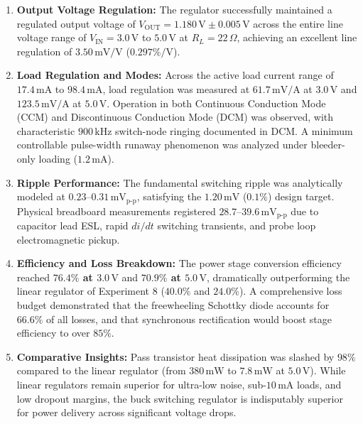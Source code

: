 \documentclass[12pt,a4paper]{article}
\newcommand{\Vout}{V_{\mathrm{OUT}}}
\newcommand{\Vin}{V_{\mathrm{IN}}}
\begin{document}
\begin{enumerate}[leftmargin=1.5em]
    \item \textbf{Output Voltage Regulation:} The regulator successfully maintained a regulated output voltage of $\Vout = 1.180\,\mathrm{V} \pm 0.005\,\mathrm{V}$ across the entire line voltage range of $\Vin = 3.0\,\mathrm{V}$ to $5.0\,\mathrm{V}$ at $R_L = 22\,\Omega$, achieving an excellent line regulation of \textbf{$3.50\,\mathrm{mV/V}$} ($0.297\%/\mathrm{V}$).
    \item \textbf{Load Regulation and Modes:} Across the active load current range of $17.4\,\mathrm{mA}$ to $98.4\,\mathrm{mA}$, load regulation was measured at \textbf{$61.7\,\mathrm{mV/A}$} at $3.0\,\mathrm{V}$ and \textbf{$123.5\,\mathrm{mV/A}$} at $5.0\,\mathrm{V}$. Operation in both Continuous Conduction Mode (CCM) and Discontinuous Conduction Mode (DCM) was observed, with characteristic $900\,\mathrm{kHz}$ switch-node ringing documented in DCM. A minimum controllable pulse-width runaway phenomenon was analyzed under bleeder-only loading ($1.2\,\mathrm{mA}$).
    \item \textbf{Ripple Performance:} The fundamental switching ripple was analytically modeled at $0.23\text{--}0.31\,\mathrm{mV}_{\mathrm{p\text{-}p}}$, satisfying the $1.20\,\mathrm{mV}$ ($0.1\%$) design target. Physical breadboard measurements registered $28.7\text{--}39.6\,\mathrm{mV}_{\mathrm{p\text{-}p}}$ due to capacitor lead ESL, rapid $di/dt$ switching transients, and probe loop electromagnetic pickup.
    \item \textbf{Efficiency and Loss Breakdown:} The power stage conversion efficiency reached \textbf{$76.4\%$ at $3.0\,\mathrm{V}$} and \textbf{$70.9\%$ at $5.0\,\mathrm{V}$}, dramatically outperforming the linear regulator of Experiment 8 ($40.0\%$ and $24.0\%$). A comprehensive loss budget demonstrated that the freewheeling Schottky diode accounts for $66.6\%$ of all losses, and that synchronous rectification would boost stage efficiency to over $85\%$.
    \item \textbf{Comparative Insights:} Pass transistor heat dissipation was slashed by \textbf{$98\%$} compared to the linear regulator (from $380\,\mathrm{mW}$ to $7.8\,\mathrm{mW}$ at $5.0\,\mathrm{V}$). While linear regulators remain superior for ultra-low noise, sub-$10\,\mathrm{mA}$ loads, and low dropout margins, the buck switching regulator is indisputably superior for power delivery across significant voltage drops.
\end{enumerate}
\end{document}
